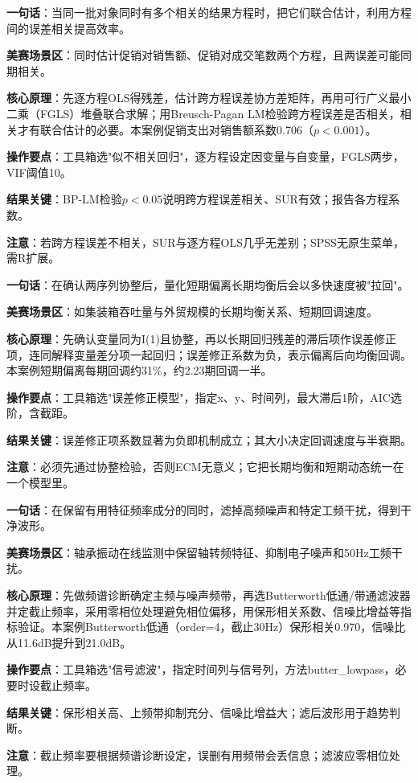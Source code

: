 \begin{algobrief}
\textbf{一句话}：当同一批对象同时有多个相关的结果方程时，把它们联合估计，利用方程间的误差相关提高效率。

\textbf{美赛场景区}：同时估计促销对销售额、促销对成交笔数两个方程，且两误差可能同期相关。

\textbf{核心原理}：先逐方程OLS得残差，估计跨方程误差协方差矩阵，再用可行广义最小二乘（FGLS）堆叠联合求解；用Breusch-Pagan LM检验跨方程误差是否相关，相关才有联合估计的必要。本案例促销支出对销售额系数0.706（$p<0.001$）。

\textbf{操作要点}：工具箱选"似不相关回归"，逐方程设定因变量与自变量，FGLS两步，VIF阈值10。

\textbf{结果关键}：BP-LM检验$p<0.05$说明跨方程误差相关、SUR有效；报告各方程系数。

\textbf{注意}：若跨方程误差不相关，SUR与逐方程OLS几乎无差别；SPSS无原生菜单，需R扩展。
\end{algobrief}


\begin{algobrief}
\textbf{一句话}：在确认两序列协整后，量化短期偏离长期均衡后会以多快速度被"拉回"。

\textbf{美赛场景区}：如集装箱吞吐量与外贸规模的长期均衡关系、短期回调速度。

\textbf{核心原理}：先确认变量同为I(1)且协整，再以长期回归残差的滞后项作误差修正项，连同解释变量差分项一起回归；误差修正系数为负，表示偏离后向均衡回调。本案例短期偏离每期回调约31\%，约2.23期回调一半。

\textbf{操作要点}：工具箱选"误差修正模型"，指定x、y、时间列，最大滞后1阶，AIC选阶，含截距。

\textbf{结果关键}：误差修正项系数显著为负即机制成立；其大小决定回调速度与半衰期。

\textbf{注意}：必须先通过协整检验，否则ECM无意义；它把长期均衡和短期动态统一在一个模型里。
\end{algobrief}


\begin{algobrief}
\textbf{一句话}：在保留有用特征频率成分的同时，滤掉高频噪声和特定工频干扰，得到干净波形。

\textbf{美赛场景区}：轴承振动在线监测中保留轴转频特征、抑制电子噪声和50Hz工频干扰。

\textbf{核心原理}：先做频谱诊断确定主频与噪声频带，再选Butterworth低通/带通滤波器并定截止频率，采用零相位处理避免相位偏移，用保形相关系数、信噪比增益等指标验证。本案例Butterworth低通（order=4，截止30Hz）保形相关0.970，信噪比从11.6dB提升到21.0dB。

\textbf{操作要点}：工具箱选"信号滤波"，指定时间列与信号列，方法butter\_lowpass，必要时设截止频率。

\textbf{结果关键}：保形相关高、上频带抑制充分、信噪比增益大；滤后波形用于趋势判断。

\textbf{注意}：截止频率要根据频谱诊断设定，误删有用频带会丢信息；滤波应零相位处理。
\end{algobrief}

